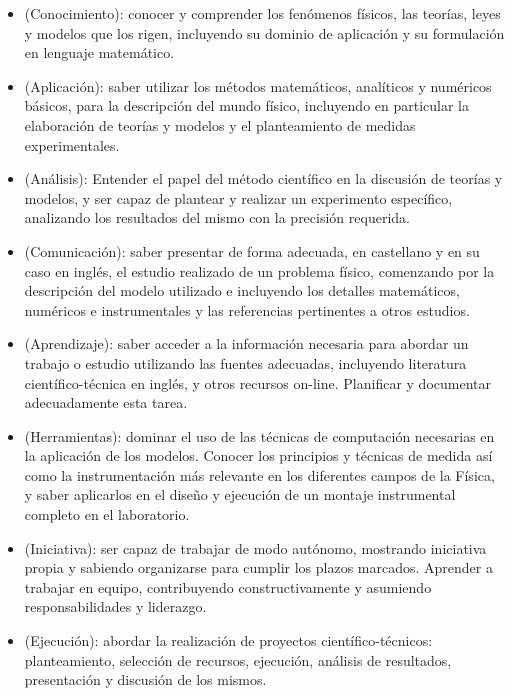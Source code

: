 \begin{itemize}

\item (Conocimiento): conocer y comprender los fenómenos físicos, las teorías, leyes y modelos que los rigen, incluyendo su dominio de aplicación y su formulación en lenguaje matemático.

\item (Aplicación): saber utilizar los métodos matemáticos, analíticos y numéricos básicos, para la descripción del mundo físico, incluyendo en particular la elaboración de teorías y modelos y el planteamiento de medidas experimentales.

\item (Análisis): Entender el papel del método científico en la discusión de teorías y modelos, y ser capaz de plantear y realizar un experimento específico, analizando los resultados del mismo con la precisión requerida.

\item (Comunicación): saber presentar de forma adecuada, en castellano y en su caso en inglés, el estudio realizado de un problema físico, comenzando por la descripción del modelo utilizado e incluyendo los detalles matemáticos, numéricos e instrumentales y las referencias pertinentes a otros estudios.

\item (Aprendizaje): saber acceder a la información necesaria para abordar un trabajo o estudio utilizando las fuentes adecuadas, incluyendo literatura científico-técnica en inglés, y otros recursos on-line. Planificar y documentar adecuadamente esta tarea.

\item (Herramientas): dominar el uso de las técnicas de computación necesarias en la aplicación de los modelos. Conocer los principios y técnicas de medida así como la instrumentación más relevante en los diferentes campos de la Física, y saber aplicarlos en el diseño y ejecución de un montaje instrumental completo en el laboratorio.

\item (Iniciativa): ser capaz de trabajar de modo autónomo, mostrando iniciativa propia y sabiendo organizarse para cumplir los plazos marcados. Aprender a trabajar en equipo, contribuyendo constructivamente y asumiendo responsabilidades y liderazgo.

\item (Ejecución): abordar la realización de proyectos científico-técnicos: planteamiento, selección de recursos, ejecución, análisis de resultados, presentación y discusión de los mismos.


\end{itemize}
